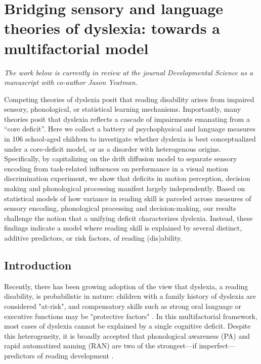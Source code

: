 \documentclass[../uwthesis.tex]{subfiles}
\begin{document}
\chapter{Bridging sensory and language theories of dyslexia: towards a multifactorial model}
\emph{The work below is currently in review at the journal Developmental Science as a manuscript with co-author Jason Yeatman.}

Competing theories of dyslexia posit that reading disability arises from impaired sensory, phonological, or statistical learning mechanisms. Importantly, many theories posit that dyslexia reflects a cascade of impairments emanating from a “core deficit”. Here we collect a battery of psychophysical and language measures in 106 school-aged children to investigate whether dyslexia is best conceptualized under a core-deficit model, or as a disorder with heterogenous origins. Specifically, by capitalizing on the drift diffusion model to separate sensory encoding from task-related influences on performance in a visual motion discrimination experiment, we show that deficits in motion perception, decision making and phonological processing manifest largely independently. Based on statistical models of how variance in reading skill is parceled across measures of sensory encoding, phonological processing and decision-making, our results challenge the notion that a unifying deficit characterizes dyslexia. Instead, these findings indicate a model where reading skill is explained by several distinct, additive predictors, or risk factors, of reading (dis)ability. 

\section{Introduction}
Recently, there has been growing adoption of the view that dyslexia, a reading disability, is probabilistic in nature: children with a family history of dyslexia are considered "at-risk", and compensatory skills such as strong oral language or executive functions may be "protective factors" \citep{Haft2016Socio-emotionalDisabilities,Hulme2015TheDyslexia,Muter2009ChildrenStudy,Pennington2006}. In this multifactorial framework, most cases of dyslexia cannot be explained by a single cognitive deficit. Despite this heterogeneity, it is broadly accepted that phonological awareness (PA) and rapid automatized naming (RAN) are two of the strongest---if imperfect---predictors of reading development \citep{Pennington2012IndividualModels.,Wolf2000Naming-speedHypothesis}.
\end{document}
